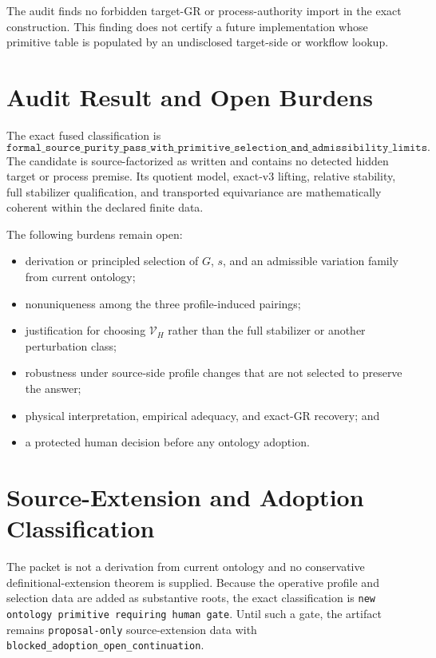 \documentclass[11pt]{article}
\newcommand{\Vary}{\mathcal V_H}
\begin{document}
The audit finds no forbidden target-GR or process-authority import in the
exact construction.  This finding does not certify a future implementation
whose primitive table is populated by an undisclosed target-side or workflow
lookup.

\section{Audit Result and Open Burdens}

The exact fused classification is
\[
\boxed{\texttt{
formal\_source\_purity\_pass\_with\_primitive\_selection\_and\_
admissibility\_limits}}.
\]
The candidate is source-factorized as written and contains no detected hidden
target or process premise.  Its quotient model, exact-v3 lifting, relative
stability, full stabilizer qualification, and transported equivariance are
mathematically coherent within the declared finite data.

The following burdens remain open:
\begin{itemize}[leftmargin=*]
  \item derivation or principled selection of \(G\), \(s\), and an
  admissible variation family from current ontology;
  \item nonuniqueness among the three profile-induced pairings;
  \item justification for choosing \(\Vary\) rather than the full stabilizer
  or another perturbation class;
  \item robustness under source-side profile changes that are not selected to
  preserve the answer;
  \item physical interpretation, empirical adequacy, and exact-GR recovery;
  and
  \item a protected human decision before any ontology adoption.
\end{itemize}

\section{Source-Extension and Adoption Classification}

The packet is not a derivation from current ontology and no conservative
definitional-extension theorem is supplied.  Because the operative profile
and selection data are added as substantive roots, the exact classification
is \texttt{new ontology primitive requiring human gate}.  Until such a gate,
the artifact remains \texttt{proposal-only} source-extension data with
\texttt{blocked\_adoption\_open\_continuation}.
\end{document}
